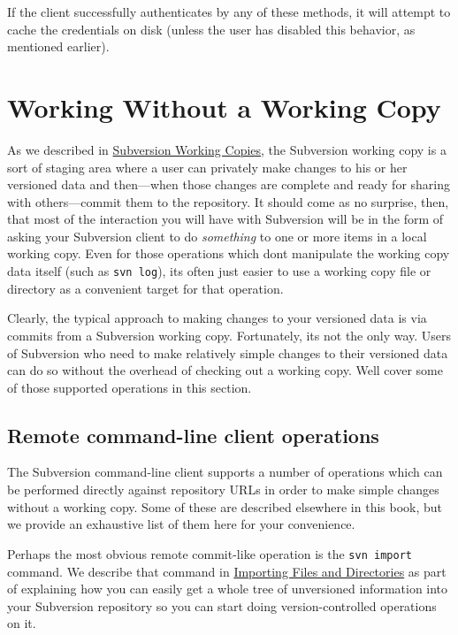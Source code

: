 If the client successfully authenticates by any of these methods, it
will attempt to cache the credentials on disk (unless the user has
disabled this behavior, as mentioned earlier).

\section{Working Without a Working
Copy}\label{svn.advanced.working-without-a-wc}

As we described in \hyperref[svn.basic.in-action.wc]{Subversion Working
Copies}, the Subversion working copy is a sort of staging area where a
user can privately make changes to his or her versioned data and
then---when those changes are complete and ready for sharing with
others---commit them to the repository. It should come as no surprise,
then, that most of the interaction you will have with Subversion will be
in the form of asking your Subversion client to do \emph{something} to
one or more items in a local working copy. Even for those operations
which don\textquotesingle t manipulate the working copy data itself
(such as \texttt{svn\ log}), it\textquotesingle s often just easier to
use a working copy file or directory as a convenient target for that
operation.

Clearly, the typical approach to making changes to your versioned data
is via commits from a Subversion working copy. Fortunately,
it\textquotesingle s not the only way. Users of Subversion who need to
make relatively simple changes to their versioned data can do so without
the overhead of checking out a working copy. We\textquotesingle ll cover
some of those supported operations in this section.

\subsection{Remote command-line client
operations}\label{svn.advanced.working-without-a-wc.svn}

The Subversion command-line client supports a number of operations which
can be performed directly against repository URLs in order to make
simple changes without a working copy. Some of these are described
elsewhere in this book, but we provide an exhaustive list of them here
for your convenience.

Perhaps the most obvious remote commit-like operation is the
\texttt{svn\ import} command. We describe that command in
\hyperref[svn.tour.importing.import]{Importing Files and Directories} as
part of explaining how you can easily get a whole tree of unversioned
information into your Subversion repository so you can start doing
version-controlled operations on it.

